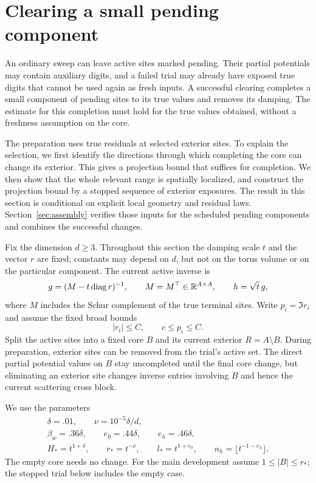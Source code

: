 \section{Clearing a small pending component}\label{sec:clearing}

An ordinary sweep can leave active sites marked pending. Their partial
potentials may contain auxiliary digits, and a failed trial may already have
exposed true digits that cannot be used again as fresh inputs. A successful clearing
completes a small component of pending sites to its true values and removes
its damping. The estimate for this completion must hold for the true values
obtained, without a freshness assumption on the core.

The preparation uses true residuals at selected exterior sites. To explain
the selection, we first identify the directions through which completing the
core can change its exterior. This gives a projection bound that suffices for
completion. We then show that the whole relevant range is spatially localized,
and construct the projection bound by a stopped sequence of exterior exposures.
The result in this section is conditional on explicit local geometry and
residual laws. Section~\ref{sec:assembly} verifies those inputs for the
scheduled pending components and combines the successful changes.

Fix the dimension $d\ge3$. Throughout this section the damping scale $t$
and the vector $r$ are fixed; constants may depend on $d$, but not on the
torus volume or on the particular component. The current active inverse is
\[
 g=(M-t\operatorname{diag} r)^{-1},\qquad M=M^\top\in\mathbb R^{A\times A},
 \qquad h=\sqrt t\,g,
\]
where $M$ includes the Schur complement of the true terminal sites. Write
$p_i=\Im r_i$ and assume the fixed broad bounds
\begin{equation}\label{eq:clearing-broad}
 |r_i|\le C,\qquad c\le p_i\le C.
\end{equation}
Split the active sites into a fixed core $B$ and its current exterior
$R=A\setminus B$. During preparation, exterior sites can be removed from
the trial's active set. The direct partial potential values on $B$ stay
uncompleted until the final core change, but eliminating an exterior site
changes inverse entries involving $B$ and hence the current scattering
cross block.

We use the parameters
\begin{equation}\label{eq:clearing-parameters}
\begin{gathered}
 \delta=.01,\qquad \nu=10^{-5}\delta/d,\\
 \beta_w=.36\delta,\qquad e_0=.44\delta,\qquad e_h=.46\delta,\\
 H_*=t^{1+\delta},\qquad r_*=t^{-\nu},\qquad
 l_*=t^{1+e_0},\qquad n_h=\lfloor t^{-1-e_h}\rfloor.
\end{gathered}
\end{equation}
The empty core needs no change. For the main development assume
$1\le |B|\le r_*$; the stopped trial below includes the empty case.

